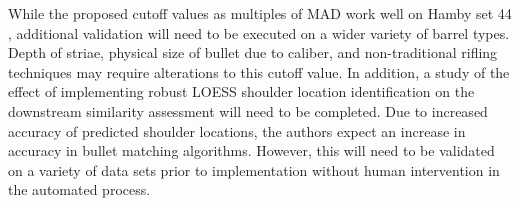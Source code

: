 \documentclass[12pt]{article}
\begin{document}
While the proposed cutoff values as multiples of MAD work well on Hamby
set 44 {\color{teal}{and Houston-test}}, additional validation will need
to be executed on a wider variety of barrel types. Depth of striae,
physical size of bullet due to caliber, and non-traditional rifling
techniques may require alterations to this cutoff value.
{\color{teal}{LEAs with shoulders which are not aligned horizontally due to tild may also require slight alterations to the method.}}
In addition, a study of the effect of implementing robust LOESS shoulder
location identification on the downstream similarity assessment will
need to be completed. Due to increased accuracy of predicted shoulder
locations, the authors expect an increase in accuracy in bullet matching
algorithms. However, this will need to be validated on a variety of data
sets prior to implementation without human intervention in the automated
process.



\end{document}
